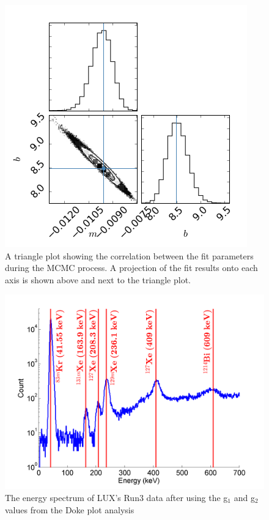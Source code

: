 \begin{figure}[H]
\centering
\includegraphics[scale=0.5]{DokeTrianglePlot.png}
\caption{A triangle plot showing the correlation between the fit parameters during the MCMC process. A projection of the fit results onto each axis is shown above and next to the triangle plot.}
\label{Corr}
\end{figure}


\begin{figure}[H]
\centering
\includegraphics[scale=0.6]{WS_Spectrum.png}
\caption{The energy spectrum of LUX's Run3 data after using the g$_1$ and g$_2$ values from the Doke plot analysis}
\label{Run3EnergySpectrum}
\end{figure}


